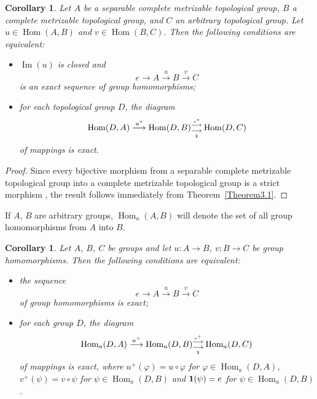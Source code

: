 \documentclass[12pt]{amsart}
\theoremstyle{theorem}
\newtheorem{corollary}[theorem]{Corollary}
\theoremstyle{definition}
\theoremstyle{remark} \theoremstyle{question} \theoremstyle{example}
\def\vr{{\varphi}}
\def\Hom{\operatorname{{Hom}}}
\def\mI{\operatorname{{Im}}}
\begin{document}
\begin{corollary}\label{Corollary3.2}
Let $A$ be a separable complete metrizable topological group,
$B$ a complete metrizable topological group, and $C$ an arbitrary
topological group. Let $u \in \Hom(A,B)$ and $v \in \Hom(B,C)$.
Then the following conditions are equivalent:

\begin{itemize}

\item[\rm (a)] $\mI(u)$ is closed and
  $$
  e \longrightarrow A \overset{u}{\longrightarrow} B \overset{v}{\longrightarrow} C
  $$
  is an exact sequence of group homomorphisms;

\item[\rm (b)] for each topological group $D$, the diagram
  $$
  \Hom(D,A) \overset{u^*}{\longrightarrow}\Hom(D,B)^{\overset{v^*}{\longrightarrow}}_{\underset{\bf 1}{\longrightarrow}} \Hom(D,C)
  $$
  of mappings is exact.

\end{itemize}
\end{corollary}

\begin{proof}
Since every bijective morphism from a separable complete metrizable topological group into a complete metrizable topological group is a
strict morphism \cite{Banach}, the result follows immediately from
Theorem~\ref{Theorem3.1}.
\end{proof}

If $A$, $B$ are arbitrary groups, $\Hom_a(A,B)$ will denote the set of all
group homomorphisms from $A$ into $B$.

\begin{corollary}\label{Corollary3.3}
Let $A$, $B$, $C$ be groups and let $u\colon A \to B$, $v\colon B \to C$ be
group homomorphisms. Then the following conditions are equivalent:

\begin{itemize}

\item[\rm (a)] the sequence
  $$
  e \longrightarrow A \overset{u}{\longrightarrow} B \overset{v}{\longrightarrow} C
  $$
  of group homomorphisms is exact;

\item[\rm (b)] for each group $D$, the diagram
  $$
  \Hom_a(D,A) \overset{u^+}{\longrightarrow} \Hom_a(D,B)^{\overset{v^+}{\longrightarrow}}_{\underset{\bf 1}{\longrightarrow}} \Hom_a(D,C)
  $$
  of mappings is exact, where  $u^+(\vr) = u \circ \vr$ for $\vr \in \Hom_a(D,A)$,\, $v^+(\psi) = v \circ \psi$ for $\psi \in \Hom_a(D,B)$ and ${\bf 1}(\psi) = e$ for $\psi \in \Hom_a(D,B)$.

\end{itemize}
\end{corollary}
\end{document}
